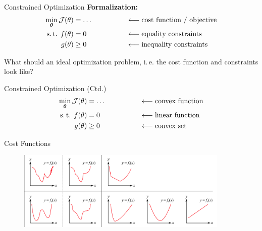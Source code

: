 \begin{frame}{Constrained Optimization}{}
	\vspace*{-3mm}
	\textbf{Formalization:}
	\begin{alignat*}{2}
		\min_{\bm{\theta}} \mathcal{J}(\theta)
			&= \dots 
			&&\qquad\qquad\longleftarrow\text{cost function / objective}			\\
		\text{s.\,t. } f(\theta)
			&= 0
			&&\qquad\qquad\longleftarrow\text{equality constraints}				\\
		g(\theta)
			&\ge 0
			&&\qquad\qquad\longleftarrow\text{inequality constraints}
	\end{alignat*}

	\begin{boxBlueNoFrame}
		What should an ideal optimization problem, i.\,e. the cost function and constraints look like?
	\end{boxBlueNoFrame}
\end{frame}


\begin{frame}{Constrained Optimization (Ctd.)}{}
	\begin{alignat*}{2}
		\min_{\bm{\theta}} \mathcal{J}(\theta)
			&= \dots 
			&&\qquad\qquad\longleftarrow\text{convex function}			\\
		\text{s.\,t. } f(\theta)
			&= 0
			&&\qquad\qquad\longleftarrow\text{linear function}			\\
		g(\theta)
			&\ge 0
			&&\qquad\qquad\longleftarrow\text{convex set}
	\end{alignat*}
\end{frame}


\begin{frame}{Cost Functions}{}
	\vspace*{4mm}
	\begin{figure}
		\centering
		\includegraphics[width=0.9\textwidth]{02_math/02_img/cost_functions}
	\end{figure}
\end{frame}


